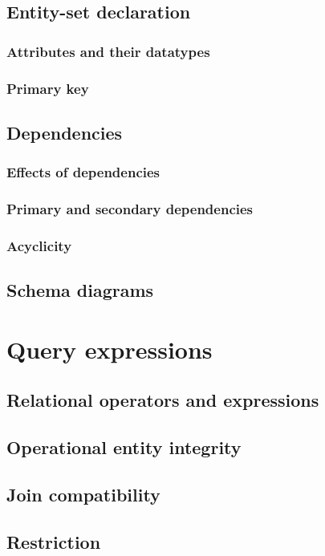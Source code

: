\documentclass[letter,twocolumn,10pt]{article}
\begin{document}
\subsection{Entity-set declaration}
\subsubsection{Attributes and their datatypes}
\subsubsection{Primary key}

\subsection{Dependencies}
\subsubsection{Effects of dependencies}
\subsubsection{Primary and secondary dependencies}
\subsubsection{Acyclicity}

\subsection{Schema diagrams}

\section{Query expressions}
\subsection{Relational operators and expressions}
\subsection{Operational entity integrity}
\subsection{Join compatibility}
\subsection{Restriction}
\end{document}

